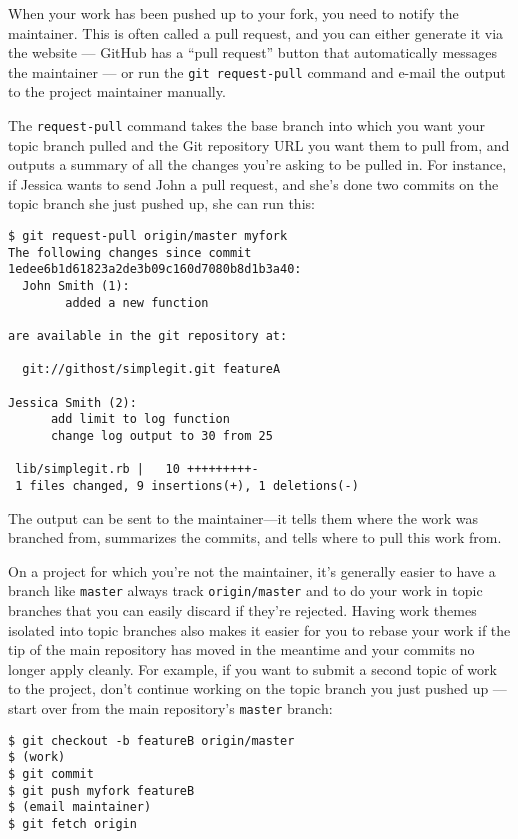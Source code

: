 \documentclass[a4paper]{book}
\begin{document}
When your work has been pushed up to your fork, you need to notify the maintainer. This is often called a pull request, and you can either generate it via the website --- GitHub has a “pull request” button that automatically messages the maintainer --- or run the \texttt{git request-pull} command and e-mail the output to the project maintainer manually.

The \texttt{request-pull} command takes the base branch into which you want your topic branch pulled and the Git repository URL you want them to pull from, and outputs a summary of all the changes you're asking to be pulled in. For instance, if Jessica wants to send John a pull request, and she's done two commits on the topic branch she just pushed up, she can run this:

\begin{shaded}\begin{verbatim}
$ git request-pull origin/master myfork
The following changes since commit 1edee6b1d61823a2de3b09c160d7080b8d1b3a40:
  John Smith (1):
        added a new function

are available in the git repository at:

  git://githost/simplegit.git featureA

Jessica Smith (2):
      add limit to log function
      change log output to 30 from 25

 lib/simplegit.rb |   10 +++++++++-
 1 files changed, 9 insertions(+), 1 deletions(-)
\end{verbatim}\end{shaded}

The output can be sent to the maintainer---it tells them where the work was branched from, summarizes the commits, and tells where to pull this work from.

On a project for which you're not the maintainer, it's generally easier to have a branch like \texttt{master} always track \texttt{origin/master} and to do your work in topic branches that you can easily discard if they're rejected. Having work themes isolated into topic branches also makes it easier for you to rebase your work if the tip of the main repository has moved in the meantime and your commits no longer apply cleanly. For example, if you want to submit a second topic of work to the project, don't continue working on the topic branch you just pushed up --- start over from the main repository's \texttt{master} branch:

\begin{shaded}\begin{verbatim}
$ git checkout -b featureB origin/master
$ (work)
$ git commit
$ git push myfork featureB
$ (email maintainer)
$ git fetch origin
\end{verbatim}\end{shaded}
\end{document}
